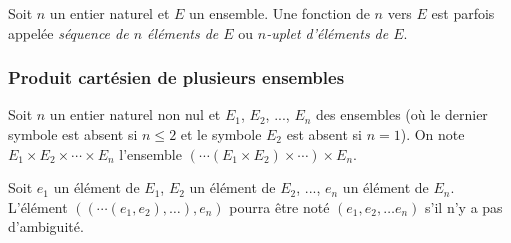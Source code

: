 Soit $n$ un entier naturel et $E$ un ensemble. 
Une fonction de $n$ vers $E$ est parfois appelée \textit{séquence de $n$ éléments de $E$} ou \textit{$n$-uplet d'éléments de $E$}.

\subsubsection{Produit cartésien de plusieurs ensembles}

Soit $n$ un entier naturel non nul et $E_1$, $E_2$, ..., $E_n$ des ensembles (où le dernier symbole est absent si $n \leq 2$ et le symbole $E_2$ est absent si $n = 1$). 
On note $E_1 \times E_2 \times \cdots \times E_n$ l'ensemble $( \cdots ( E_1 \times E_2 ) \times  \cdots ) \times E_n$.

Soit $e_1$ un élément de $E_1$, $E_2$ un élément de $E_2$, ..., $e_n$ un élément de $E_n$. 
L'élément $(( \cdots ( e_1, e_2 ), \dots ), e_n)$ pourra être noté $(e_1, e_2, \dots e_n)$ s'il n'y a pas d'ambiguité. 
